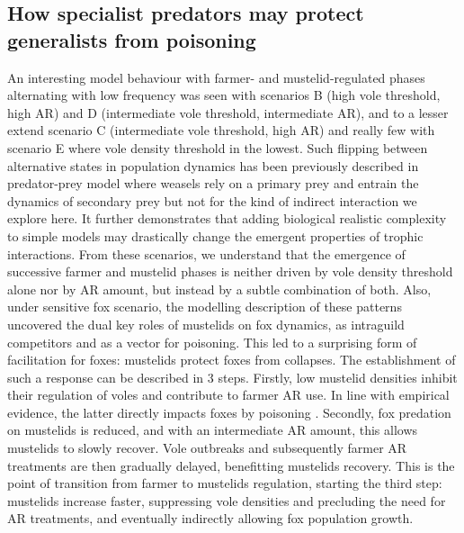 \documentclass[11pt]{article}
\begin{document}
\subsection{How specialist predators may protect generalists from poisoning}

An interesting model behaviour  with farmer- and mustelid-regulated phases alternating with low frequency was seen with scenarios B (high vole threshold, high AR) and D (intermediate vole threshold, intermediate AR), and to a lesser extend scenario C (intermediate vole threshold, high AR) and really few with scenario E where vole density threshold in the lowest.
%
Such flipping between alternative states in population dynamics has been previously described in predator-prey model where weasels rely on a primary prey and entrain the dynamics of secondary prey \citep{Hanski1996} but not for the kind of indirect interaction we explore here. It further demonstrates that adding biological realistic complexity to simple models may drastically change the emergent properties of trophic interactions.
%
From these scenarios, we understand that the emergence of successive farmer and mustelid phases is neither driven by vole density threshold alone nor by AR amount, but instead by a subtle combination of both.
%
Also, under sensitive fox scenario, the modelling description of these patterns uncovered the dual key roles of mustelids on fox dynamics, as intraguild competitors and as a vector for poisoning. This led to a surprising form of facilitation for foxes: mustelids protect foxes from collapses. The establishment of such a response can be described in 3 steps. Firstly, low mustelid densities inhibit their regulation of voles and contribute to farmer AR use. In line with empirical evidence, the latter directly impacts foxes by poisoning \citep{Jacquot2013}. Secondly, fox predation on mustelids is reduced, and with an intermediate AR amount, this allows mustelids to slowly recover. Vole outbreaks and subsequently farmer AR treatments are then gradually delayed, benefitting mustelids recovery. This is the point of transition from farmer to mustelids regulation, starting the third step: mustelids increase faster, suppressing vole densities and precluding the need for AR treatments, and eventually indirectly allowing fox population growth.
\end{document}
